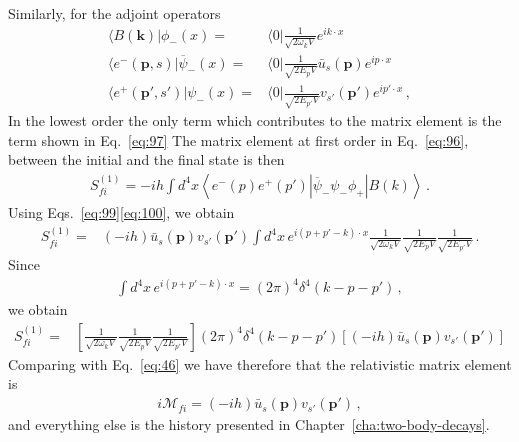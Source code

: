 Similarly, for the adjoint operators
\begin{align}
  \label{eq:100}
   \langle B(\mathbf{k})|\phi_-(x)=&\langle0|\frac{1}{\sqrt{2 \omega_k V}}e^{i k\cdot x}\nonumber\\
  \langle e^-(\mathbf{p},s)|\overline{\psi}_-(x)=&\langle0|\frac{1}{\sqrt{2 E_p V}}\bar{u}_s(\mathbf{p})e^{i p\cdot x}\nonumber\\
  \langle e^+(\mathbf{p}',s')|\psi_-(x)=&\langle0|\frac{1}{\sqrt{2 E_{p'} V}}v_{s'}(\mathbf{p}')e^{i p'\cdot x}\,,
\end{align}
In the lowest order the only term which contributes to the matrix element is the term shown in Eq.~\eqref{eq:97}
The matrix element at first order in Eq.~\eqref{eq:96}, between the initial and the final state is then
\begin{align}
  S_{fi}^{(1)}=-i h \int d^4x\left\langle e^-(p)e^+(p')\left|\overline{\psi}_-\psi_-\phi_+\right|B(k)\right\rangle\,.
\end{align}
Using Eqs.~\eqref{eq:99}\eqref{eq:100}, we obtain
\begin{align}
  S_{fi}^{(1)}=&(-i h)\bar{u}_s(\mathbf{p}) v_{s'}(\mathbf{p}')
\int d^4x\,e^{i(p+p'-k)\cdot x}\frac{1}{\sqrt{2\omega_k V}}\frac{1}{\sqrt{2E_p V}}\frac{1}{\sqrt{2E_{p'} V}}\,.
\end{align}
Since
\begin{align}
  \int d^4x\,e^{i(p+p'-k)\cdot x}=(2\pi)^4\delta^4(k-p-p')\,,
\end{align}
we obtain
\begin{align}
  S_{fi}^{(1)}=&\left[\frac{1}{\sqrt{2\omega_k V}}\frac{1}{\sqrt{2E_p V}}\frac{1}{\sqrt{2E_{p'} V}}\right]
(2\pi)^4\delta^4(k-p-p')\left[(-i h)\bar{u}_s(\mathbf{p}) v_{s'}(\mathbf{p}')\right]
\end{align}
Comparing with Eq.~\eqref{eq:46} we have therefore that the relativistic matrix element is
\begin{align}
  i\mathcal{M}_{fi}=(-i h)\bar{u}_s(\mathbf{p}) v_{s'}(\mathbf{p}')\,,
\end{align}
and everything else is the history presented in Chapter~\ref{cha:two-body-decays}. 

